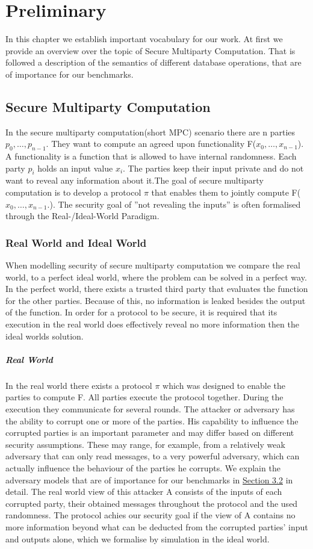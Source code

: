 \label{Preliminary}	
\chapter{Preliminary}
In this chapter we establish important vocabulary for our work. At first we provide an overview over the topic of Secure Multiparty Computation. That is followed a description of the semantics of different database operations, that are of importance for our benchmarks.  
\section{Secure Multiparty Computation}
In the secure multiparty computation(short MPC) scenario there are n parties 
$ p_0,\dots,p_{n-1} $. They want to compute an agreed upon functionality F($ x_0,\dots,x_{n-1} $). A functionality is a function that is allowed to have internal randomness. 
Each party $ p_i $ holds an input value $ x_i $. 
The parties keep their input private and do not want to reveal any information about it.The goal of secure multiparty computation is to develop a protocol  $ \pi $ that enables them to jointly compute F($ x_0,\dots,x_{n-1}. $). The security goal of ''not revealing the inputs'' is often formalised through the Real-/Ideal-World Paradigm. 


\subsection{Real World and Ideal World}
When modelling security of secure multiparty computation we compare the real world, to a perfect ideal world, where the problem can be solved in a perfect way. In the perfect world, there exists a trusted third party that evaluates the function for the other parties. Because of this, no information is leaked besides the output of the function. In order for a protocol to be secure, it is required that its execution in the real world does effectively reveal no more information then the ideal worlds solution.   
\paragraph{Real World}
In the real world there exists a protocol $\pi $ which was designed to enable the parties to compute F. All parties execute the protocol together. During the execution they communicate for several rounds. The attacker or adversary has the ability to corrupt one or more of the parties. His capability to influence the corrupted parties is an important parameter and may differ based on different security assumptions. These may range, for example, from a relatively weak adversary that can only read messages, to a very powerful adversary, which can actually influence the behaviour of the parties he corrupts. We explain the adversary models that are of importance for our benchmarks in \hyperref[sec:Adversarial Models]{Section 3.2} in detail.
The real world view of this attacker A consists of the inputs of each corrupted party, their obtained messages throughout the protocol and the used randomness. The protocol achies our security goal if the view of A contains no more information beyond what can be deducted from the corrupted parties' input and outputs alone, which we formalise by simulation in the ideal world. 
